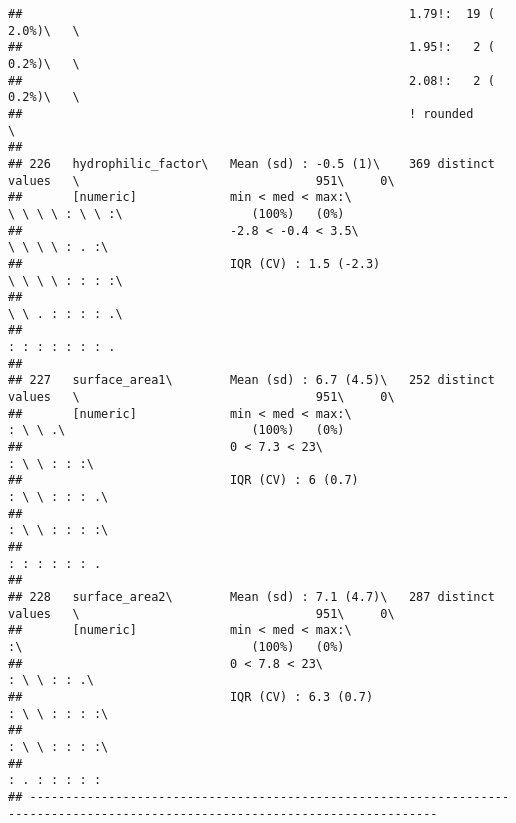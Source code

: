 \documentclass[]{article}
\begin{document}
\begin{verbatim}
##                                                      1.79!:  19 ( 2.0%)\   \                                                   
##                                                      1.95!:   2 ( 0.2%)\   \                                                   
##                                                      2.08!:   2 ( 0.2%)\   \                                                   
##                                                      ! rounded             \                                                   
## 
## 226   hydrophilic_factor\   Mean (sd) : -0.5 (1)\    369 distinct values   \                                 951\     0\       
##       [numeric]             min < med < max:\                              \ \ \ \ : \ \ :\                  (100%)   (0%)     
##                             -2.8 < -0.4 < 3.5\                             \ \ \ \ : . :\                                      
##                             IQR (CV) : 1.5 (-2.3)                          \ \ \ \ : : : :\                                    
##                                                                            \ \ . : : : : .\                                    
##                                                                            : : : : : : : .                                     
## 
## 227   surface_area1\        Mean (sd) : 6.7 (4.5)\   252 distinct values   \                                 951\     0\       
##       [numeric]             min < med < max:\                              : \ \ .\                          (100%)   (0%)     
##                             0 < 7.3 < 23\                                  : \ \ : : :\                                        
##                             IQR (CV) : 6 (0.7)                             : \ \ : : : .\                                      
##                                                                            : \ \ : : : :\                                      
##                                                                            : : : : : : .                                       
## 
## 228   surface_area2\        Mean (sd) : 7.1 (4.7)\   287 distinct values   \                                 951\     0\       
##       [numeric]             min < med < max:\                              :\                                (100%)   (0%)     
##                             0 < 7.8 < 23\                                  : \ \ : : .\                                        
##                             IQR (CV) : 6.3 (0.7)                           : \ \ : : : :\                                      
##                                                                            : \ \ : : : :\                                      
##                                                                            : . : : : : :                                       
## -------------------------------------------------------------------------------------------------------------------------------
\end{verbatim}
\end{document}
